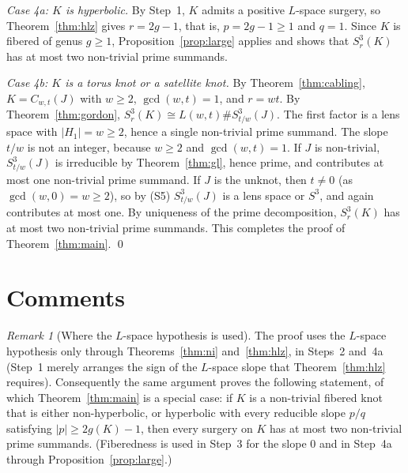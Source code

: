 \documentclass[11pt]{article}
\newcommand{\Surg}[2]{S^3_{#1}(#2)}
\theoremstyle{definition}
\theoremstyle{remark}
\newtheorem{remark}[theorem]{Remark}
\begin{document}
\emph{Case 4a: \(K\) is hyperbolic.} By Step~1, \(K\) admits a positive
\(L\)-space surgery, so Theorem~\ref{thm:hlz} gives \(r=2g-1\), that is,
\(p=2g-1\geq1\) and \(q=1\). Since \(K\) is fibered of genus \(g\geq1\),
Proposition~\ref{prop:large} applies and shows that \(\Surg{r}{K}\) has at
most two non-trivial prime summands.

\emph{Case 4b: \(K\) is a torus knot or a satellite knot.} By
Theorem~\ref{thm:cabling}, \(K=C_{w,t}(J)\) with \(w\geq2\),
\(\gcd(w,t)=1\), and \(r=wt\). By Theorem~\ref{thm:gordon},
\(\Surg{r}{K}\cong L(w,t)\#\Surg{t/w}{J}\). The first factor is a lens
space with \(|H_1|=w\geq2\), hence a single non-trivial prime summand.
The slope \(t/w\) is not an integer, because \(w\geq2\) and
\(\gcd(w,t)=1\). If \(J\) is non-trivial, \(\Surg{t/w}{J}\) is irreducible
by Theorem~\ref{thm:gl}, hence prime, and contributes at most one
non-trivial prime summand. If \(J\) is the unknot, then \(t\neq0\) (as
\(\gcd(w,0)=w\geq2\)), so by (S5) \(\Surg{t/w}{J}\) is a lens space or
\(S^3\), and again contributes at most one. By uniqueness of the prime
decomposition, \(\Surg{r}{K}\) has at most two non-trivial prime
summands.
This completes the proof of Theorem~\ref{thm:main}. \qed

\section{Comments}\label{sec:comments}

\begin{remark}[Where the \(L\)-space hypothesis is used]
The proof uses the \(L\)-space hypothesis only through
Theorems~\ref{thm:ni} and~\ref{thm:hlz}, in Steps~2 and~4a (Step~1
merely arranges the sign of the \(L\)-space slope that
Theorem~\ref{thm:hlz} requires). Consequently the same argument proves
the following statement, of which Theorem~\ref{thm:main} is a special
case: if \(K\) is a non-trivial fibered knot that is either
non-hyperbolic, or hyperbolic with every reducible slope \(p/q\)
satisfying \(|p|\geq2g(K)-1\), then every surgery on \(K\) has at most
two non-trivial prime summands. (Fiberedness is used in Step~3 for the
slope \(0\) and in Step~4a through Proposition~\ref{prop:large}.)
\end{remark}
\end{document}

